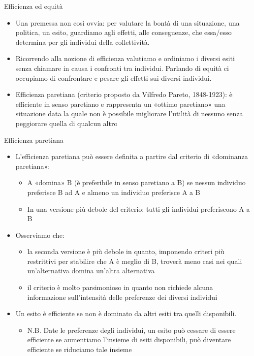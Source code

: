 \documentclass[aspectratio=64,11pt]{beamer}
\begin{document}
\begin{frame}{Efficienza ed equità}
\begin{itemize}
\item Una premessa non così ovvia: per valutare la bontà di una situazione, una politica, un esito, guardiamo agli \alert{effetti}, alle \alert{conseguenze}, che essa/esso determina per gli individui della collettività.
\item Ricorrendo alla nozione di \alert{efficienza} valutiamo e ordiniamo i diversi esiti senza chiamare in causa i confronti tra individui. Parlando di \alert{equità} ci occupiamo di confrontare e pesare gli effetti sui diversi individui.
\item \alert{Efficienza paretiana} (criterio proposto da Vilfredo Pareto, 1848-1923): è efficiente in senso paretiano e rappresenta un «ottimo paretiano» una situazione data la quale non è possibile migliorare l’utilità di nessuno senza peggiorare quella di qualcun altro
\end{itemize}
\end{frame}

\begin{frame}{Efficienza paretiana}
\begin{itemize}
\item L’efficienza paretiana può essere definita a partire dal criterio di «dominanza paretiana»:
\begin{itemize}
\item A «domina» B (è preferibile in senso paretiano a B) se nessun individuo preferisce B ad A e almeno un individuo preferisce A a B
\item In una versione più debole del criterio: tutti gli individui preferiscono A a B
\end{itemize}
\item Osserviamo che:
\begin{itemize}
\item la seconda versione è più debole in quanto, imponendo criteri più restrittivi per stabilire che A è meglio di B, troverà meno casi nei quali un’alternativa domina un’altra alternativa
\item il criterio è molto parsimonioso in quanto non richiede alcuna informazione sull’intensità delle preferenze dei diversi individui
\end{itemize}
\item Un esito è efficiente se non è dominato da altri esiti tra quelli disponibili.
\begin{itemize}
\item N.B. Date le preferenze degli individui, un esito può cessare di essere efficiente se aumentiamo l’insieme di esiti disponibili, può diventare efficiente se riduciamo tale insieme
\end{itemize}
\end{itemize}
\end{frame}
\end{document}

